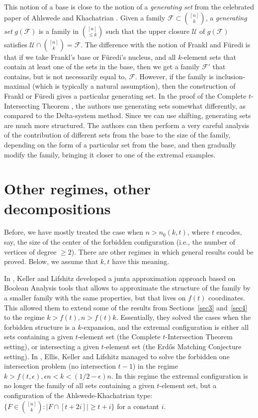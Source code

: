 \documentclass[graybox]{svmult}
\renewcommand{\le}{\leqslant}
\renewcommand{\ge}{\geqslant}
\newcommand{\ff}{\mathcal{F}}
\begin{document}
This notion of a base is close to the notion of a {\em generating set} from the celebrated paper of Ahlswede and Khachatrian \cite{AK}. Given a family $\ff\subset {[n]\choose k}$, a {\it generating set } $g(\mathcal F)$ is a family in ${[n]\choose \le k}$ such that the upper closure $\mathcal U$ of $g(\ff)$ satisfies $\mathcal U\cap {[n]\choose k} = \ff$. The difference with the notion of Frankl and F\"uredi is that if we take Frankl's base or F\"uredi's nucleus, and all $k$-element sets that contain at least one of the sets in the base, then we get a family $\ff'$ that contains, but is not necessarily equal to, $\ff$.  However, if the family is inclusion-maximal (which is typically a natural assumption), then the construction of Frankl or F\"uredi gives a particular generating set. In the proof of the Complete $t$-Intersecting Theorem \cite{AK}, the authors use generating sets somewhat differently, as compared to the Delta-system method. Since we can use shifting, generating sets are much more structured. The authors can then perform a very careful analysis of the contribution of different sets from the base to the size of the family, depending on the form of a particular set from the base, and then gradually modify the family, bringing it closer to one of the extremal examples.

\section{Other regimes, other decompositions}\label{sec7}
Before, we have mostly treated  the case when $n>n_0(k,t)$, where $t$ encodes, say, the size of the center of the forbidden configuration (i.e., the number of vertices of degree $\ge 2$). There are other regimes in which general results could be proved. Below, we assume that $k,t$ have this meaning.

In \cite{KL}, Keller and Lifshitz developed a junta approximation approach based on Boolean Analysis tools that allows to approximate the structure of the family by a smaller family with the same properties, but that lives on $f(t)$ coordinates. This allowed them to extend some of the results from Sections~\ref{sec3} and~\ref{sec4} to the regime $k>f(t), n>f(t)k$. Essentially, they solved the cases when the forbidden structure is a $k$-expansion, and the extremal configuration is either all sets containing a given $t$-element set (the Complete $t$-Intersection Theorem setting), or intersecting a given $t$-element set (the Erd\H os Matching Conjecture setting). In \cite{EKL}, Ellis, Keller and Lifshitz managed to solve the forbidden one intersection problem (no intersection $t-1$) in the regime  $k>f(t,\epsilon), \epsilon n<k<(1/2-\epsilon)n$. In this regime the extremal configuration is no longer the family of all sets containing a given $t$-element set, but a configuration of the Ahlswede-Khachatrian type: $\{F\in {[n]\choose k}: |F\cap [t+2i]|\ge t+i\}$ for a constant $i$.
\end{document}
